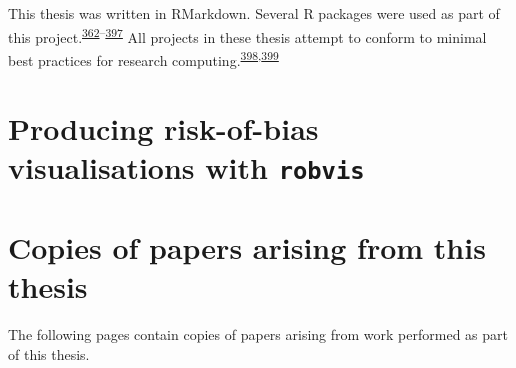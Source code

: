 \documentclass[a4paper, twoside]{templates/ociamthesis}
\newcommand*{\bibtitle}{Bibliography}
\begin{document}
This thesis was written in RMarkdown. Several R packages were used as part of this project.\textsuperscript{\protect\hyperlink{ref-R-base}{362}--\protect\hyperlink{ref-sylly2018}{397}}
All projects in these thesis attempt to conform to minimal best practices for research computing.\textsuperscript{\protect\hyperlink{ref-wilson2014}{398},\protect\hyperlink{ref-wilson2017}{399}}

\hypertarget{appendix-robvis}{%
\section{\texorpdfstring{Producing risk-of-bias visualisations with \texttt{robvis}}{Producing risk-of-bias visualisations with robvis}}\label{appendix-robvis}}

\newpage

\hypertarget{published-papers}{%
\section{Copies of papers arising from this thesis}\label{published-papers}}

The following pages contain copies of papers arising from work performed as part of this thesis.








\setlength{\baselineskip}{0pt} %

{\renewcommand*\MakeUppercase[1]{#1}%
\printbibliography[heading=bibintoc,title={\bibtitle}]}
\end{document}
